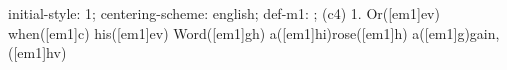initial-style: 1;
centering-scheme: english;
def-m1: \grealign;
(c4) 1. Or([em1]ev) when([em1]c) his([em1]ev) Word([em1]gh) a([em1]hi)rose([em1]h) a([em1]g)gain,([em1]hv)